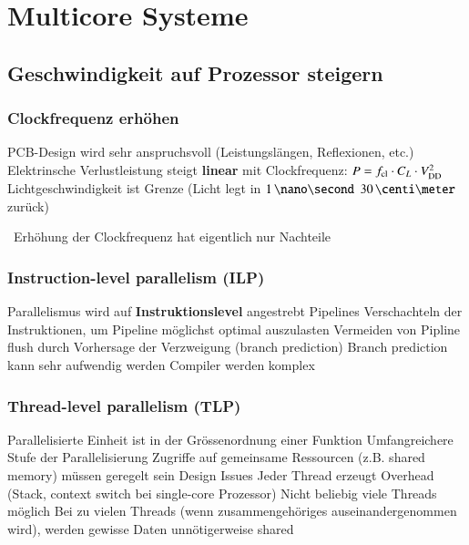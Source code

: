 \section{Multicore Systeme}

\subsection{Geschwindigkeit auf Prozessor steigern}

\subsubsection{Clockfrequenz erhöhen}

\begin{outline}
    \1 PCB-Design wird sehr anspruchsvoll (Leistungslängen, Reflexionen, etc.)
    \1 Elektrinsche Verlustleistung steigt \textbf{linear} mit Clockfrequenz: $P = f_{\rm cl} \cdot C_L \cdot V_{\rm DD}^2$
    \1 Lichtgeschwindigkeit ist Grenze (Licht legt in $1 \, \nano \second$ $30 \, \centi \meter$ zurück)
\end{outline}

\vspace{0.1cm}

\textrightarrow\ Erhöhung der Clockfrequenz hat eigentlich nur Nachteile

\subsubsection{Instruction-level parallelism (ILP)}

\begin{outline}
    \1 Parallelismus wird auf \textbf{Instruktionslevel} angestrebt
        \2 Pipelines
        \2 Verschachteln der Instruktionen, um Pipeline möglichst optimal auszulasten
        \2 Vermeiden von Pipline flush durch Vorhersage der Verzweigung (branch prediction)
    \1[-] Branch prediction kann sehr aufwendig werden
    \1[-] Compiler werden komplex
\end{outline}


\subsubsection{Thread-level parallelism (TLP)}

\begin{outline}
    \1 Parallelisierte Einheit ist in der Grössenordnung einer Funktion
        \2 Umfangreichere Stufe der Parallelisierung
    \1 Zugriffe auf gemeinsame Ressourcen (z.B. shared memory) müssen geregelt sein
    \1 Design Issues
        \2 Jeder Thread erzeugt Overhead (Stack, context switch bei single-core Prozessor)
        \2 Nicht beliebig viele Threads möglich
        \2 Bei zu vielen Threads (wenn zusammengehöriges auseinandergenommen wird), werden
            gewisse Daten unnötigerweise shared
\end{outline}


